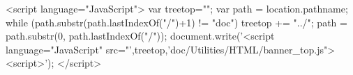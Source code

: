 \begin{rawhtml}
<script language="JavaScript">
var treetop="";
var path = location.pathname;
while (path.substr(path.lastIndexOf("/")+1) != "doc") {
  treetop += "../";
  path = path.substr(0, path.lastIndexOf("/"));
}
document.write('<script language="JavaScript" src="',treetop,'doc/Utilities/HTML/banner_top.js"><\/script>');
</script>
\end{rawhtml}
